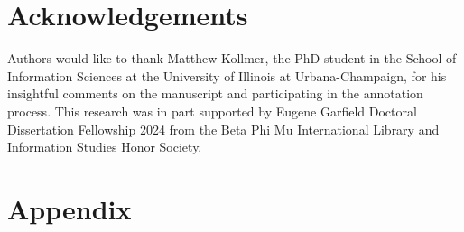 \documentclass[11pt]{article}
\begin{document}
\section{Acknowledgements} \label{acknowledgements}
Authors would like to thank Matthew Kollmer, the PhD student in the School of Information Sciences at the University of Illinois at Urbana-Champaign, for his insightful comments on the manuscript and participating in the annotation process. 
This research was in part supported by Eugene Garfield Doctoral Dissertation Fellowship 2024 from the Beta Phi Mu International Library and Information Studies Honor Society.



\appendix

\section{Appendix} \label{sec:appendix A}
\end{document}
